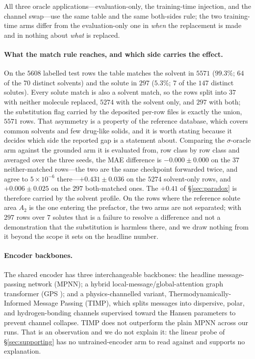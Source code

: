 All three oracle applications---evaluation-only, the training-time injection, and the
channel swap---use the same table and the same both-sides rule; the two training-time arms differ
from the evaluation-only one in \emph{when} the replacement is made and in nothing about \emph{what}
is replaced.

\paragraph{What the match rule reaches, and which side carries the effect.} On the $5608$ labelled
test rows the table matches the solvent in $5571$ ($99.3\%$; $64$ of the $70$ distinct solvents) and
the solute in $297$ ($5.3\%$; $7$ of the $147$ distinct solutes). Every solute match is also a
solvent match, so the rows split into $37$ with neither molecule replaced, $5274$ with the solvent
only, and $297$ with both; the substitution flag carried by the deposited per-row files
is exactly the union, $5571$ rows. That asymmetry is a property of the reference database, which
covers common solvents and few drug-like solids, and it is worth stating because it decides which
side the reported gap is a statement about. Comparing the $\sigma$-oracle arm against the grounded
arm it is evaluated from, row class by row class and averaged over the three seeds, the MAE
difference is $-0.000\pm0.000$ on the $37$ neither-matched rows---the two are the same checkpoint
forwarded twice, and agree to $5\times10^{-6}$ there---$+0.431\pm0.036$ on the $5274$ solvent-only
rows, and $+0.006\pm0.025$ on the $297$ both-matched ones. The $+0.41$ of \S\ref{sec:paradox} is
therefore carried by the solvent profile. On the rows where the reference solute area $A_2$ is the
one entering the prefactor, the two arms are not separated; with $297$ rows over $7$ solutes that is
a failure to resolve a difference and not a demonstration that the substitution is harmless there,
and we draw nothing from it beyond the scope it sets on the headline number.

\paragraph{Encoder backbones.} The shared encoder has three interchangeable backbones: the
headline message-passing network (MPNN); a hybrid local-message/global-attention graph transformer
(GPS \cite{rampasek2022}); and a physics-channelled variant, Thermodynamically-Informed Message
Passing (TIMP), which splits messages into dispersive, polar, and hydrogen-bonding channels
supervised toward the Hansen parameters to prevent channel collapse. TIMP does not outperform the plain
MPNN across our runs. That is an observation and we do not explain it: the linear probe of
\S\ref{sec:supporting} has no untrained-encoder arm to read against and supports no
explanation.
